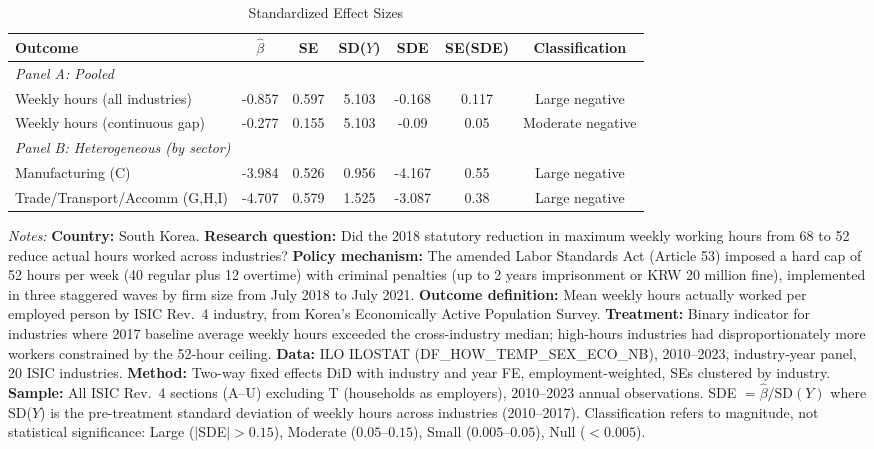 \begin{table}[t]
\centering
\caption{Standardized Effect Sizes}
\label{tab:sde}
\begin{adjustbox}{max width=\textwidth}
\begin{tabular}{lcccccc}
\hline\hline
Outcome & $\hat{\beta}$ & SE & SD($Y$) & SDE & SE(SDE) & Classification \\
\hline
\multicolumn{7}{l}{\textit{Panel A: Pooled}} \\
Weekly hours (all industries) & -0.857 & 0.597 & 5.103 & -0.168 & 0.117 & Large negative \\
Weekly hours (continuous gap) & -0.277 & 0.155 & 5.103 & -0.09 & 0.05 & Moderate negative \\
\hline
\multicolumn{7}{l}{\textit{Panel B: Heterogeneous (by sector)}} \\
Manufacturing (C) & -3.984 & 0.526 & 0.956 & -4.167 & 0.55 & Large negative \\
Trade/Transport/Accomm (G,H,I) & -4.707 & 0.579 & 1.525 & -3.087 & 0.38 & Large negative \\
\hline\hline
\end{tabular}
\end{adjustbox}
\begin{tablenotes}
\footnotesize
\item \textit{Notes:} \textbf{Country:} South Korea. \textbf{Research question:} Did the 2018 statutory reduction in maximum weekly working hours from 68 to 52 reduce actual hours worked across industries? \textbf{Policy mechanism:} The amended Labor Standards Act (Article 53) imposed a hard cap of 52 hours per week (40 regular plus 12 overtime) with criminal penalties (up to 2 years imprisonment or KRW 20 million fine), implemented in three staggered waves by firm size from July 2018 to July 2021. \textbf{Outcome definition:} Mean weekly hours actually worked per employed person by ISIC Rev.~4 industry, from Korea's Economically Active Population Survey. \textbf{Treatment:} Binary indicator for industries where 2017 baseline average weekly hours exceeded the cross-industry median; high-hours industries had disproportionately more workers constrained by the 52-hour ceiling. \textbf{Data:} ILO ILOSTAT (DF\_HOW\_TEMP\_SEX\_ECO\_NB), 2010--2023, industry-year panel, 20 ISIC industries. \textbf{Method:} Two-way fixed effects DiD with industry and year FE, employment-weighted, SEs clustered by industry. \textbf{Sample:} All ISIC Rev.~4 sections (A--U) excluding T (households as employers), 2010--2023 annual observations. SDE $= \hat{\beta} / \text{SD}(Y)$ where SD($Y$) is the pre-treatment standard deviation of weekly hours across industries (2010--2017). Classification refers to magnitude, not statistical significance: Large ($|$SDE$| > 0.15$), Moderate ($0.05$--$0.15$), Small ($0.005$--$0.05$), Null ($< 0.005$).
\end{tablenotes}
\end{table}
